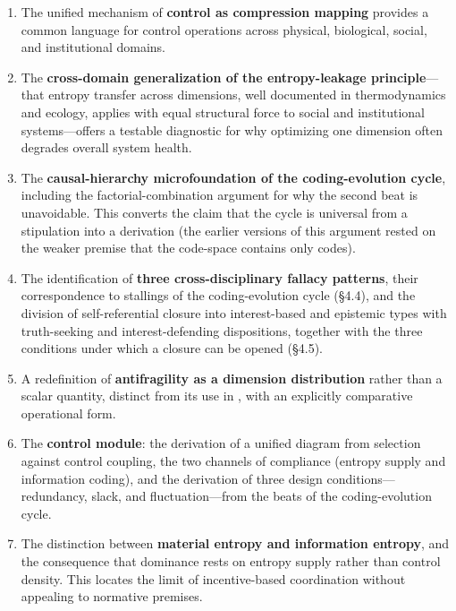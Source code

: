 \documentclass[11pt,a4paper]{article}
\begin{document}
\begin{enumerate}
    \item The unified mechanism of \textbf{control as compression mapping} provides a common language for control operations across physical, biological, social, and institutional domains.

    \item The \textbf{cross-domain generalization of the entropy-leakage principle}---that entropy transfer across dimensions, well documented in thermodynamics and ecology, applies with equal structural force to social and institutional systems---offers a testable diagnostic for why optimizing one dimension often degrades overall system health.

    \item The \textbf{causal-hierarchy microfoundation of the coding-evolution cycle}, including the factorial-combination argument for why the second beat is unavoidable. This converts the claim that the cycle is universal from a stipulation into a derivation (the earlier versions of this argument rested on the weaker premise that the code-space contains only codes).

    \item The identification of \textbf{three cross-disciplinary fallacy patterns}, their correspondence to stallings of the coding-evolution cycle (\S4.4), and the division of self-referential closure into interest-based and epistemic types with truth-seeking and interest-defending dispositions, together with the three conditions under which a closure can be opened (\S4.5).

    \item A redefinition of \textbf{antifragility as a dimension distribution} rather than a scalar quantity, distinct from its use in \citet{taleb2012}, with an explicitly comparative operational form.

    \item The \textbf{control module}: the derivation of a unified diagram from selection against control coupling, the two channels of compliance (entropy supply and information coding), and the derivation of three design conditions---redundancy, slack, and fluctuation---from the beats of the coding-evolution cycle.

    \item The distinction between \textbf{material entropy and information entropy}, and the consequence that dominance rests on entropy supply rather than control density. This locates the limit of incentive-based coordination without appealing to normative premises.


\end{enumerate}
\end{document}
